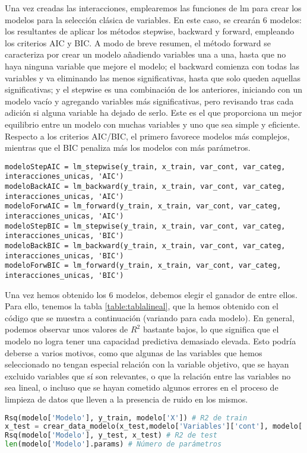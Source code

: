 \documentclass[a4paper,onecolumn]{extarticle}
\begin{document}
\begin{sloppypar}
Una vez creadas las interacciones, emplearemos las funciones de lm para crear los modelos para la selección clásica de variables. En este caso, se crearán 6 
modelos: los resultantes de aplicar los métodos stepwise, backward y forward, empleando los criterios AIC y BIC. A modo de breve resumen, el método forward 
se caracteriza por crear un modelo añadiendo variables una a una, hasta que no haya ninguna variable que mejore el modelo; el backward comienza con todas 
las variables y va eliminando las menos significativas, hasta que solo queden aquellas significativas; y el stepwise es una combinación de los anteriores, 
iniciando con un modelo vacío y agregando variables más significativas, pero revisando tras cada adición si alguna variable ha dejado de serlo. Este es el que
proporciona un mejor equilibrio entre un modelo con muchas variables y uno que sea simple y eficiente. Respecto a los criterios AIC/BIC, el primero favorece 
modelos más complejos, mientras que el BIC penaliza más los modelos con más parámetros.
\begin{lstlisting}
modeloStepAIC = lm_stepwise(y_train, x_train, var_cont, var_categ, interacciones_unicas, 'AIC')
modeloBackAIC = lm_backward(y_train, x_train, var_cont, var_categ, interacciones_unicas, 'AIC')
modeloForwAIC = lm_forward(y_train, x_train, var_cont, var_categ, interacciones_unicas, 'AIC')
modeloStepBIC = lm_stepwise(y_train, x_train, var_cont, var_categ, interacciones_unicas, 'BIC')
modeloBackBIC = lm_backward(y_train, x_train, var_cont, var_categ, interacciones_unicas, 'BIC')
modeloForwBIC = lm_forward(y_train, x_train, var_cont, var_categ, interacciones_unicas, 'BIC')
\end{lstlisting}

Una vez hemos obtenido los 6 modelos, debemos elegir el ganador de entre ellos. Para ello, tenemos la tabla \ref{table:tablalineal}, que la hemos obtenido con
el código que se muestra a continuación (variando para cada modelo). En general, podemos observar unos valores de $R^2$ bastante bajos, lo que significa que
el modelo no logra tener una capacidad predictiva demasiado elevada. Esto podría deberse a varios motivos, como que algunas de las variables que hemos 
seleccionado no tengan especial relación con la variable objetivo, que se hayan excluido variables que sí son relevantes, o que la relación entre las 
variables no sea lineal, o incluso que se hayan cometido algunos errores en el proceso de limpieza de datos que lleven a la presencia de ruido en los mismos. 

\begin{lstlisting}[language=Python]
Rsq(modelo['Modelo'], y_train, modelo['X']) # R2 de train
x_test = crear_data_modelo(x_test,modelo['Variables']['cont'], modelo['Variables']['categ'], modelo['Variables']['inter'])
Rsq(modelo['Modelo'], y_test, x_test) # R2 de test
len(modelo['Modelo'].params) # Número de parámetros
\end{lstlisting}


\end{sloppypar}
\end{document}
